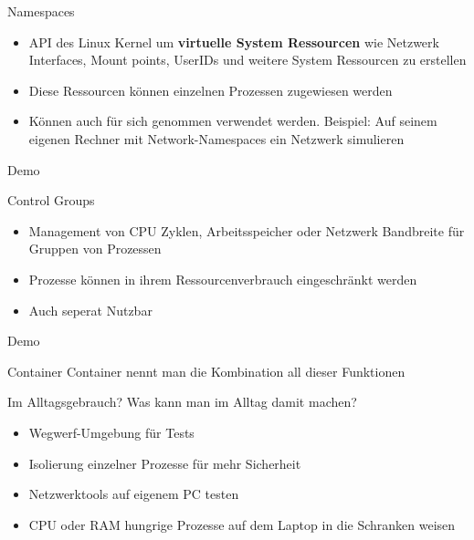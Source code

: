 \documentclass{beamer}
\begin{document}
  \begin{frame}{Namespaces}
    \begin{itemize}[<+->]
      \item API des Linux Kernel um \textbf{virtuelle System Ressourcen} wie Netzwerk Interfaces, Mount points, UserIDs und weitere System Ressourcen zu erstellen
      \item Diese Ressourcen können einzelnen Prozessen zugewiesen
werden
      \item Können auch für sich genommen verwendet werden. Beispiel: Auf seinem eigenen Rechner mit Network-Namespaces ein Netzwerk simulieren
    \end{itemize}
  \end{frame}
  \begin{frame}[standout]
    Demo
  \end{frame}
  
  \begin{frame}{Control Groups}
    \begin{itemize}[<+->]
      \item Management von CPU Zyklen, Arbeitsspeicher oder Netzwerk Bandbreite für Gruppen von Prozessen
      \item Prozesse können in ihrem Ressourcenverbrauch eingeschränkt werden
      \item Auch seperat Nutzbar
    \end{itemize}
  \end{frame}
  \begin{frame}[standout]
    Demo
  \end{frame}

  \begin{frame}{Container}
    Container nennt man die Kombination all dieser Funktionen
  \end{frame}

  \begin{frame}{Im Alltagsgebrauch?}
    Was kann man im Alltag damit machen?
    \begin{itemize}[<+->]
      \item Wegwerf-Umgebung für Tests
      \item Isolierung einzelner Prozesse für mehr Sicherheit
      \item Netzwerktools auf eigenem PC testen
      \item CPU oder RAM hungrige Prozesse auf dem Laptop in die Schranken weisen
    \end{itemize}
  \end{frame}
  
\end{document}
